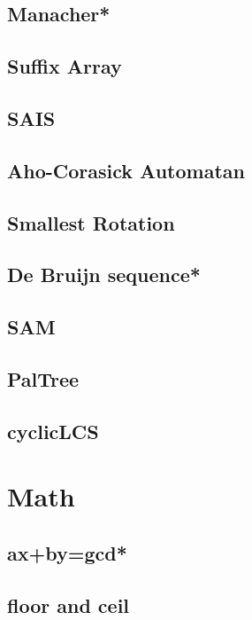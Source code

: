 \subsection{Manacher*} %

\subsection{Suffix Array}

\subsection{SAIS}

\subsection{Aho-Corasick Automatan}

\subsection{Smallest Rotation}

\subsection{De Bruijn sequence*} %

\subsection{SAM}

\subsection{PalTree}

\subsection{cyclicLCS}



\section{Math}
\subsection{ax+by=gcd*} %

\subsection{floor and ceil}

% 
